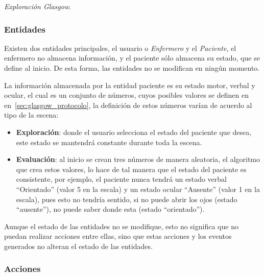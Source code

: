 
\emph{Exploración Glasgow}.

\subsubsection{Entidades}

Existen dos entidades principales, el usuario o \emph{Enfermero} y el \emph{Paciente}, 
el enfermero no almacena información, y el
paciente sólo almacena su estado, que se define al inicio. De esta forma, las
entidades no se modifican en ningún momento.

La información almacenada por la entidad paciente es su estado motor, verbal y
ocular, el cual es un conjunto de números, cuyos posibles valores se definen en
en~\ref{sec:glasgow_protocolo}, la definición de estos números varían de acuerdo
al tipo de la escena:

\begin{itemize}
    \item \textbf{Exploración}: donde el usuario selecciona el estado
        del paciente que desea, este estado se mantendrá constante durante toda
        la escena.
    \item \textbf{Evaluación}: al inicio se crean tres números de manera
        aleatoria, el algoritmo que crea estos valores, lo hace de tal manera
        que el estado del paciente es consistente, por ejemplo, el paciente
        nunca tendrá un estado verbal \enquote{Orientado} (valor 5 en la escala)
        y un estado ocular \enquote{Ausente} (valor 1 en la escala), pues esto
        no tendría sentido, si no puede abrir los ojos (estado
        \enquote{ausente}), no puede saber donde esta (estado
        \enquote{orientado}).
\end{itemize}

Aunque el estado de las entidades no se modifique, esto no significa que no
puedan realizar acciones entre ellas, sino que estas acciones y los eventos
generados no alteran el estado de las entidades.

\subsubsection{Acciones} 

